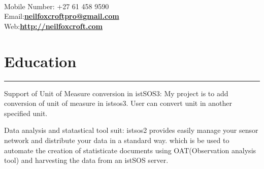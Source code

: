 \documentclass[]{neilfoxcroft-resume}
\begin{document}
\begin{minipage}[t]{0.66\textwidth} 
\hspace*{0pt}\hfill         \\
\hspace*{0pt}\hfill         \\
\hspace*{0pt}\hfill         \\
\hspace*{0pt}\hfill Mobile Number: +27 61 458 9590 \\
\hspace*{0pt}\hfill Email:\space \textbf{\href{mailto:neilfoxcroftpro@gmail.com}{neilfoxcroftpro@gmail.com}} \\
\hspace*{0pt}\hfill Web:\space \textbf{\href{http://neilfoxcroft.com}{http://neilfoxcroft.com}} 
\section{Education}
\noindent\rule{12.5cm}{0.4pt}
 
\noindent
\hspace{5em}%
\begin{minipage}{0.85\textwidth\vspace{2pt}}
Support of Unit of Measure conversion in istSOS3: My project is to add conversion of
unit of measure in istsos3. User can convert unit in another specified unit.
\end{minipage}
\sectionsep

 
\noindent
\hspace{5em}%
\begin{minipage}{0.85\textwidth\vspace{2pt}}
Data analysis and statastical tool suit: istsos2 provides easily manage your sensor network
and distribute your data in a standard way. which is be used to automate the creation of statisticate
documents using OAT(Observation analysis tool) and harvesting the data from an istSOS server.
\end{minipage}
\sectionsep

\end{minipage}
\end{document}
